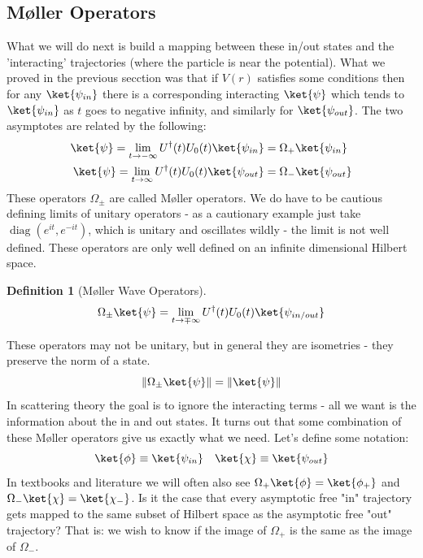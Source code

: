 \documentclass{article}
\DeclareMathOperator{\diag}{\textrm{diag}}
\renewcommand{\norm}[1]{\left\lVert#1\right\rVert}
\newtheorem{defn}{Definition}
\begin{document}
\subsection{M\o ller Operators}
What we will do next is build a mapping between these in/out states and the 'interacting' trajectories (where the particle is near the potential). What we proved in the previous secction was that if $V(r)$ satisfies some conditions then for any $\ket{\psi_{in}}$ there is a corresponding interacting $\ket{\psi}$ which tends to $\ket{\psi_{in}}$ as $t$ goes to negative infinity, and similarly for $\ket{\psi_{out}}$. The two asymptotes are related by the following:
\begin{align}
\ket{\psi}=\lim_{t\to-\infty}U^\dagger (t)U_0(t)\ket{\psi_{in}}&=\Omega_+\ket{\psi_{in}}\\
\ket{\psi}=\lim_{t\to\infty}U^\dagger (t)U_0(t)\ket{\psi_{out}}&=\Omega_-\ket{\psi_{out}}
\end{align}
These operators $\Omega_{\pm}$ are called M\o ller operators. We do have to be cautious defining limits of unitary operators - as a cautionary example just take $\diag(e^{it},e^{-it})$, which is unitary and oscillates wildly - the limit is not well defined. These operators are only well defined on an infinite dimensional Hilbert space.
\begin{defn}[M\o ller Wave Operators] 
\[\Omega_{\pm}\ket{\psi} = \lim_{t\to\mp\infty}U^\dagger (t)U_0(t)\ket{\psi_{in/out}}\]
\end{defn}
These operators may not be unitary, but in general they are isometries - they preserve the norm of a state.
\[\norm{\Omega_{\pm}\ket{\psi}}=\norm{\ket{\psi}}\]
In scattering theory the goal is to ignore the interacting terms - all we want is the information about the in and out states. It turns out that some combination of these M\o ller operators give us exactly what we need. Let's define some notation: 
\begin{equation}
\ket{\phi}\equiv \ket{\psi_{in}} \hspace{1em}
\ket{\chi}\equiv \ket{\psi_{out}}
\end{equation}
In textbooks and literature we will often also see $\Omega_+ \ket{\phi}=\ket{\phi_+}$ and $\Omega_-\ket{\chi}=\ket{\chi_-}$. Is it the case that every asymptotic free "in" trajectory gets mapped to the same subset of Hilbert space as the asymptotic free "out" trajectory? That is: we wish to know if the image of $\Omega_+$ is the same as the image of $\Omega_-$.
\end{document}
